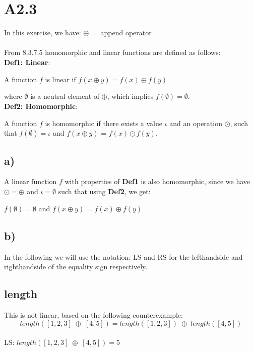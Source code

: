 \newpage
\section*{A2.3}
In this exercise, we have: $\oplus =$ append operator\\
\\
From 8.3.7.5 homomorphic and linear functions are defined as follows:\\

\textbf{Def1: Linear}:
\begin{center}
A function $f$ is linear if $f(x \oplus y) = f(x) \oplus f(y)$
\end{center}
where $\emptyset$ is a neutral element of $\oplus$, which implies $f(\emptyset) = \emptyset$.\\

\textbf{Def2: Homomorphic}:
\begin{center}
A function $f$ is homomorphic if there exists a value $\iota$ and an operation $\odot$, such that $f(\emptyset ) = \iota$  and $f(x \oplus y)$ = $f(x) \odot f(y)$.
\end{center}

\subsection*{a)}
A linear function $f$ with properties of \textbf{Def1} is also homomorphic, since we have $\odot = \oplus$ and $\iota = \emptyset$ such that using \textbf{Def2}, we get:

\begin{center}
$f(\emptyset ) = \emptyset$  and $f(x \oplus y)$ = $f(x) \oplus f(y)$
\end{center}

\subsection*{b)}
In the following we will use the notation: LS and RS for the lefthandside and righthandside of the equality sign respectively.

\subsection*{length}
This is not linear, based on the following counterexample:\\
$$
  length( [1,2,3] \; \oplus \; [4,5]) = length( [1,2,3]) \; \oplus \; length( [4,5] )
$$
\\
LS: \tab
$
length( [1,2,3] \; \oplus \; [4,5]) = 5
$

